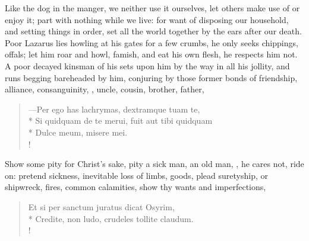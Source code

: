 {Like the dog in the manger, we neither use it ourselves, let others
make use of or enjoy it; part with nothing while we live: for want of
disposing our household, and setting things in order, set all the world
together by the ears after our death. Poor Lazarus lies howling at his
gates for a few crumbs, he only seeks chippings, offals; let him roar
and howl, famish, and eat his own flesh, he respects him not. A poor
decayed kinsman of his sets upon him by the way in all his jollity, and
runs begging bareheaded by him, conjuring by those former bonds of
friendship, alliance, consanguinity, \etc{}, uncle, cousin, brother,
father,
%
\begin{latin}
\begin{verse}
---Per ego has lachrymas, dextramque tuam te,\\*
Si quidquam de te merui, fuit aut tibi quidquam\\*
Dulce meum, misere mei.\\!
\end{verse}
\end{latin}

Show some pity for Christ's sake, pity a sick man, an old man, \etc{}, he
cares not, ride on: pretend sickness, inevitable loss of limbs, goods,
plead suretyship, or shipwreck, fires, common calamities, show thy
wants and imperfections,
%
\begin{latin}
\begin{verse}
Et si per sanctum juratus dicat Osyrim,\\*
Credite, non ludo, crudeles tollite claudum.\\!
\end{verse}
\end{latin}

}
